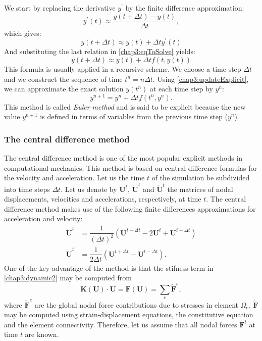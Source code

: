 We start by replacing the derivative $y^{'} $ by the finite difference approximation:
\begin{equation}
\label{chap3:approxExplicit}
y^{'}(t) \approx \dfrac{y(t+\Delta t) - y(t)}{\Delta t},
\end{equation}
which gives:
\begin{equation}
y(t+\Delta t) \approx y(t) + \Delta t y^{'}(t)
\end{equation}
And substituting the last relation in \eqref{chap3:eqToSolve} yields:
\begin{equation}
\label{chap3:updateExplicit}
y(t+\Delta t) \approx y(t) + \Delta t f(t, y(t))
\end{equation}
This formula is usually applied in a recursive scheme. We choose a time step $ \Delta t $ and we construct the sequence of time $ t^n = n \Delta t$. Using \eqref{chap3:updateExplicit}, we can approximate the exact solution $ y(t^n) $ at each time step by $ y^n $:
\begin{equation}
y^{n+1} = y^n + \Delta t f(t^n, y^n).
\end{equation}
This method is called \emph{Euler method} and is said to be explicit because the new value $ y^{n+1} $ is defined in terms of variables from the previous time step ($ y^n $).


		\subsubsection*{The central difference method}	
The central difference method is one of the most popular explicit methods in computational mechanics. This method is based on central difference formulas for the velocity and acceleration. Let us the time $ t $ of the simulation be subdivided into time steps $ \Delta t $. Let us denote by $ \mathbf{U}^t $, $ \mathbf{\dot U}^t $ and $ \mathbf{\ddot U }^t $ the matrices of nodal displacements, velocities and accelerations, respectively, at time $ t $. The central difference method makes use of the following finite differences approximations for acceleration and velocity:
\begin{align}
\mathbf{\ddot U}^t &= \dfrac{1}{(\Delta t)^2} \left( \mathbf{U}^{t-\Delta t} - 2 \mathbf{U}^{t} +\mathbf{U}^{t+\Delta t} \right) \label{chap3:accelerationApprox}\\
\mathbf{\dot U}^t &= \dfrac{1}{2 \Delta t} \left( \mathbf{U}^{t+\Delta t} - \mathbf{U}^{t-\Delta t} \right). \label{chap3:velocityApprox}
\end{align}
One of the key advantage of the method is that the stifness term in \eqref{chap3:dynamic2} may be computed from
\begin{equation}
\mathbf{K}(\mathbf{U}) \cdot \mathbf{U} = \mathbf{F}(\mathbf{U}) = \sum_e \tilde{\mathbf{F}}^e,
\end{equation}
where $ \tilde{\mathbf{F}}^e $ are the global nodal force contributions due to stresses in element $ \Omega_e $. $ \tilde{\mathbf{F}} $ may be computed using strain-displacement equations, the constitutive equation and the element connectivity. Therefore, let us assume that all nodal forces $\mathbf{F}^t $  at time $ t $ are known. 

